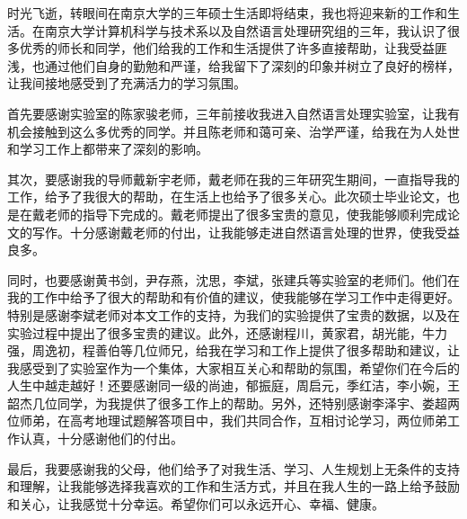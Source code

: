 \documentclass[master, winfont]{njuthesis}
\begin{document}
\nocite{*}

%
%
\begin{acknowledgement}
  时光飞逝，转眼间在南京大学的三年硕士生活即将结束，我也将迎来新的工作和生活。在南京大学计算机科学与技术系以及自然语言处理研究组的三年，我认识了很多优秀的师长和同学，他们给我的工作和生活提供了许多直接帮助，让我受益匪浅，也通过他们自身的勤勉和严谨，给我留下了深刻的印象并树立了良好的榜样，让我间接地感受到了充满活力的学习氛围。

  首先要感谢实验室的陈家骏老师，三年前接收我进入自然语言处理实验室，让我有机会接触到这么多优秀的同学。并且陈老师和蔼可亲、治学严谨，给我在为人处世和学习工作上都带来了深刻的影响。
  
  其次，要感谢我的导师戴新宇老师，戴老师在我的三年研究生期间，一直指导我的工作，给予了我很大的帮助，在生活上也给予了很多关心。此次硕士毕业论文，也是在戴老师的指导下完成的。戴老师提出了很多宝贵的意见，使我能够顺利完成论文的写作。十分感谢戴老师的付出，让我能够走进自然语言处理的世界，使我受益良多。

  同时，也要感谢黄书剑，尹存燕，沈思，李斌，张建兵等实验室的老师们。他们在我的工作中给予了很大的帮助和有价值的建议，使我能够在学习工作中走得更好。特别是感谢李斌老师对本文工作的支持，为我们的实验提供了宝贵的数据，以及在实验过程中提出了很多宝贵的建议。此外，还感谢程川，黄家君，胡光能，牛力强，周逸初，程善伯等几位师兄，给我在学习和工作上提供了很多帮助和建议，让我感受到了实验室作为一个集体，大家相互关心和帮助的氛围，希望你们在今后的人生中越走越好！还要感谢同一级的尚迪，郁振庭，周启元，季红洁，李小婉，王韶杰几位同学，为我提供了很多工作上的帮助。另外，还特别感谢李泽宇、娄超两位师弟，在高考地理试题解答项目中，我们共同合作，互相讨论学习，两位师弟工作认真，十分感谢他们的付出。
  
  最后，我要感谢我的父母，他们给予了对我生活、学习、人生规划上无条件的支持和理解，让我能够选择我喜欢的工作和生活方式，并且在我人生的一路上给予鼓励和关心，让我感觉十分幸运。希望你们可以永远开心、幸福、健康。
   
\end{acknowledgement}
\appendix
\end{document}
